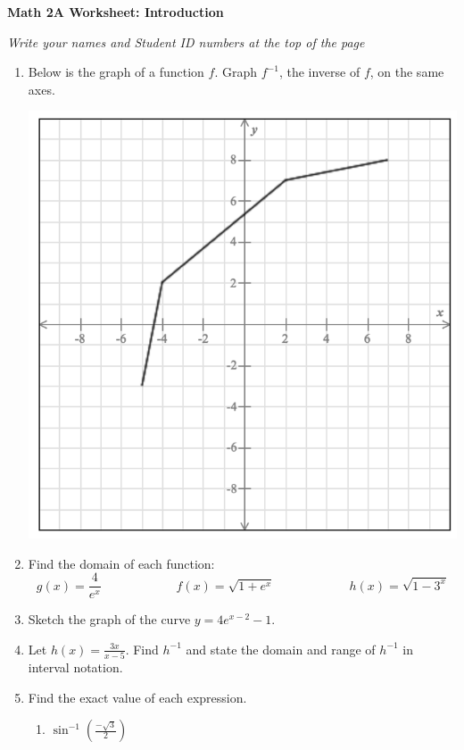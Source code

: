 \documentclass[12pt,fleqn]{article}
\begin{document}
\begin{center}
	\textbf{Math 2A Worksheet: Introduction}
\end{center}

\emph{Write your names and Student ID numbers at the top of the page}

\begin{enumerate}

	
	
	\item Below is the graph of a function $f$. Graph $f^{-1}$, the inverse of $f$, on the same axes.
	
	\includegraphics[width=0.5\linewidth]{1-intro3.png}
	
	
  
	
	\item Find the domain of each function:
	\[g(x)=\dfrac 4{e^x}\qquad\qquad\qquad
	 f(x)=\sqrt{1+e^x}\qquad\qquad\qquad
	 h(x)=\sqrt{1-3^x}\]
	  
	\vfill
	
	
	\item Sketch the graph of the curve $y=4e^{x-2}-1$.
	
	\vfill\newpage
	
	\item Let $\displaystyle h(x)=\frac{3x}{x-5}$. Find $h^{-1}$ and state the domain and range of $h^{-1}$ in interval notation.
	
	\vspace{200pt}
	
	\item Find the exact value of each expression.
	\begin{enumerate}
	  \item $\displaystyle \sin^{-1}\left(\frac{-\sqrt 3}2\right)$
	  
	  \vfill
	  

\end{enumerate}
\end{enumerate}
\end{document}
